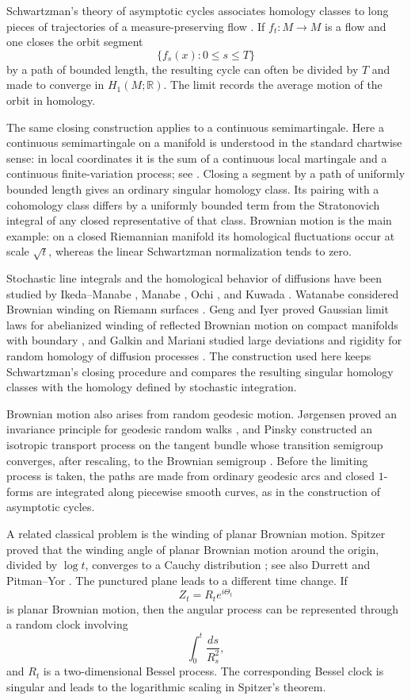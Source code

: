 \documentclass[a4paper,reqno]{amsart}
\newcommand{\R}{\mathbb R}
\theoremstyle{definition}
\begin{document}
Schwartzman's theory of asymptotic cycles associates homology classes to long pieces of trajectories of a measure-preserving flow \cite{Schwartzman}.  If $f_t:M\to M$ is a flow and one closes the orbit segment
\[
   \{f_s(x):0\le s\le T\}
\]
by a path of bounded length, the resulting cycle can often be divided by $T$ and made to converge in $H_1(M;\R)$.  The limit records the average motion of the orbit in homology.

The same closing construction applies to a continuous semimartingale.  Here a continuous semimartingale on a manifold is understood in the standard chartwise sense: in local coordinates it is the sum of a continuous local martingale and a continuous finite-variation process; see \cite{Emery}.  Closing a segment by a path of uniformly bounded length gives an ordinary singular homology class.  Its pairing with a cohomology class differs by a uniformly bounded term from the Stratonovich integral of any closed representative of that class.  Brownian motion is the main example: on a closed Riemannian manifold its homological fluctuations occur at scale $\sqrt t$, whereas the linear Schwartzman normalization tends to zero.

Stochastic line integrals and the homological behavior of diffusions have been studied by Ikeda--Manabe \cite{IkedaManabe}, Manabe \cite{Manabe}, Ochi \cite{Ochi}, and Kuwada \cite{Kuwada}.  Watanabe considered Brownian winding on Riemann surfaces \cite{Watanabe}.  Geng and Iyer proved Gaussian limit laws for abelianized winding of reflected Brownian motion on compact manifolds with boundary \cite{GengIyer}, and Galkin and Mariani studied large deviations and rigidity for random homology of diffusion processes \cite{GalkinMariani}.  The construction used here keeps Schwartzman's closing procedure and compares the resulting singular homology classes with the homology defined by stochastic integration.

Brownian motion also arises from random geodesic motion.  J{\o}rgensen proved an invariance principle for geodesic random walks \cite{Jorgensen}, and Pinsky constructed an isotropic transport process on the tangent bundle whose transition semigroup converges, after rescaling, to the Brownian semigroup \cite{Pinsky}.  Before the limiting process is taken, the paths are made from ordinary geodesic arcs and closed $1$-forms are integrated along piecewise smooth curves, as in the construction of asymptotic cycles.

A related classical problem is the winding of planar Brownian motion.  Spitzer proved that the winding angle of planar Brownian motion around the origin, divided by $\log t$, converges to a Cauchy distribution \cite{Spitzer}; see also Durrett \cite{Durrett} and Pitman--Yor \cite{PitmanYor}.  The punctured plane leads to a different time change.  If
\[
   Z_t=R_t e^{i\Theta_t}
\]
is planar Brownian motion, then the angular process can be represented through a random clock involving
\[
   \int_0^t \frac{ds}{R_s^2},
\]
and $R_t$ is a two-dimensional Bessel process.  The corresponding Bessel clock is singular and leads to the logarithmic scaling in Spitzer's theorem.
\end{document}
